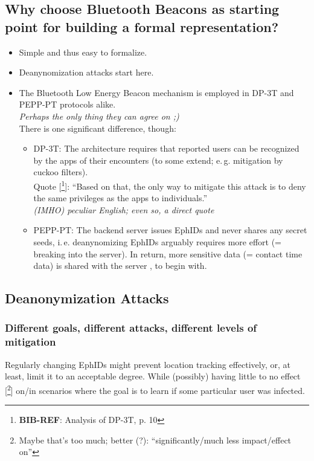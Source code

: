 \documentclass{article}
\newcommand*{\TODO}[2][todoC]{{\color{#1} #2}}
\newcommand*{\TODOsty}[2][styC]{\TODO[#1]{#2}}
\newcommand*{\TODOnsr}[2][nsrC]{\TODO[#1]{#2}}
\newcommand*{\NOTE}[2][noteC]{\TODO[#1]{\textit{#2}}}
\newcommand*{\TODOfn}[2][noteC]{\TODO[#1]{[\footnote{\TODO[#1]{#2}}]}}
\newcommand*{\TODOref}[2][todoC]{\TODOfn[#1]{\textbf{BIB-REF}: #2}}
\begin{document}
\subsection{Why choose Bluetooth Beacons as starting point for building a formal representation?}
\begin{itemize}
\item Simple and thus easy to formalize.
\item Deanynomization attacks start here.
\item The Bluetooth Low Energy Beacon mechanism is employed in DP-3T and PEPP-PT protocols \TODOnsr{alike}.\\
  \NOTE{Perhaps the only thing they can agree on ;)}\smallskip\\
  There is one significant difference, though:
  \begin{itemize}
  \item DP-3T:
    The architecture requires that reported users can be recognized
    by the apps of their encounters
    (to some extend; e.\,g. mitigation by cuckoo filters).\smallskip\\
    Quote \TODOref{Analysis of DP-3T, p. 10}:
    ``Based on that, the only way to mitigate this attack is to deny the same
    privileges as the apps to individuals.''\smallskip\\
    \NOTE{(IMHO) peculiar English; even so, a direct quote}
  \item PEPP-PT:
    The backend server issues EphIDs and never shares any secret seeds,
    i.\,e. deanynomizing EphIDs \TODOnsr{arguably} requires more effort
    (= breaking into the server).
    \TODOnsr{In return}, more sensitive data (= contact time data)
    is shared with the server\TODOnsr{, to begin with}.
  \end{itemize}
\end{itemize}

\subsection{Deanonymization Attacks}
\subsubsection{Different goals, different attacks, different levels of mitigation}
Regularly changing EphIDs might prevent location tracking effectively, or, \TODOnsr{at least, limit it to an acceptable degree}. While \TODOsty{(possibly)} having \TODOnsr{little to no effect}\TODOfn[nsrC]{Maybe that's too much; better (?): ``significantly/much less impact/effect on''} \TODOsty{on/in} scenarios where \TODOsty{the goal is to learn if} some particular user was infected.
\end{document}
